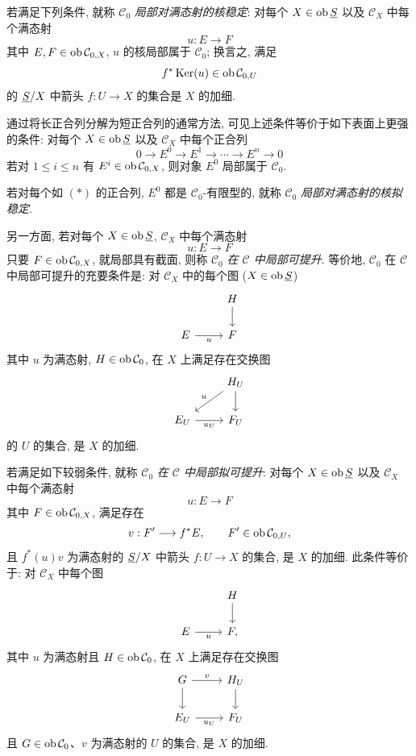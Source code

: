 若满足下列条件, 就称 \(\mathcal C_0\) \emph{局部对满态射的核稳定}: 对每个 \(X\in\operatorname{ob} \underline S\) 以及 \(\mathcal C_X\) 中每个满态射
\[
  u:E\longrightarrow F
\]
其中 \(E,F\in\operatorname{ob}\mathcal C_{0,X}\), \(u\) 的核局部属于 \(\mathcal C_0\); 换言之, 满足
\[
  f^*\operatorname{Ker}(u)\in\operatorname{ob}\mathcal C_{0,U}
\]
的 \(\underline S/X\) 中箭头 \(f:U\to X\) 的集合是 \(X\) 的加细.

通过将长正合列分解为短正合列的通常方法, 可见上述条件等价于如下表面上更强的条件: 对每个 \(X\in\operatorname{ob} \underline S\) 以及 \(\mathcal C_X\) 中每个正合列
\begin{equation}\tag{*}
  0\longrightarrow E^0\longrightarrow E^1\longrightarrow\cdots\longrightarrow E^n\longrightarrow 0
\end{equation}
若对 \(1\leq i\leq n\) 有 \(E^i\in\operatorname{ob}\mathcal C_{0,X}\), 则对象 \(E^0\) 局部属于 \(\mathcal C_0\).

若对每个如 \((*)\) 的正合列, \(E^0\) 都是 \(\mathcal C_0\)-有限型的, 就称 \(\mathcal C_0\) \emph{局部对满态射的核拟稳定}.

另一方面, 若对每个 \(X\in\operatorname{ob} \underline S\), \(\mathcal C_X\) 中每个满态射
\[
  u:E\longrightarrow F
\]
只要 \(F\in\operatorname{ob}\mathcal C_{0,X}\), 就局部具有截面, 则称 \(\mathcal C_0\) \emph{在 \(\mathcal C\) 中局部可提升}. 等价地, \(\mathcal C_0\) 在 \(\mathcal C\) 中局部可提升的充要条件是: 对 \(\mathcal C_X\) 中的每个图 (\(X\in\operatorname{ob} \underline S\))
\[
\begin{tikzcd}
& H \arrow[d]\\
E \arrow[r,"u"'] & F
\end{tikzcd}
\]
其中 \(u\) 为满态射, \(H\in\operatorname{ob}\mathcal C_0\), 在 \(X\) 上满足存在交换图
\[
\begin{tikzcd}
& H_U \arrow[d] \arrow[dl,"u"']\\
E_U \arrow[r,"u_U"'] & F_U
\end{tikzcd}
\]
的 \(U\) 的集合, 是 \(X\) 的加细.

若满足如下较弱条件, 就称 \(\mathcal C_0\) \emph{在 \(\mathcal C\) 中局部拟可提升}: 对每个 \(X\in\operatorname{ob} \underline S\) 以及 \(\mathcal C_X\) 中每个满态射
\[
  u:E\longrightarrow F
\]
其中 \(F\in\operatorname{ob}\mathcal C_{0,X}\), 满足存在
\[
  v:F'\longrightarrow f^*E,\qquad F'\in\operatorname{ob}\mathcal C_{0,U},
\]
且 \(f^*(u)v\) 为满态射的 \(\underline S/X\) 中箭头 \(f:U\to X\) 的集合, 是 \(X\) 的加细. 此条件等价于: 对 \(\mathcal C_X\) 中每个图
\[
\begin{tikzcd}
& H \arrow[d]\\
E \arrow[r,"u"'] & F ,
\end{tikzcd}
\]
其中 \(u\) 为满态射且 \(H\in\operatorname{ob}\mathcal C_0\), 在 \(X\) 上满足存在交换图
\[
\begin{tikzcd}
G \arrow[r,"v"] \arrow[d] & H_U \arrow[d]\\
E_U \arrow[r,"u_U"'] & F_U
\end{tikzcd}
\]
且 \(G\in\operatorname{ob}\mathcal C_0\)、\(v\) 为满态射的 \(U\) 的集合, 是 \(X\) 的加细.

